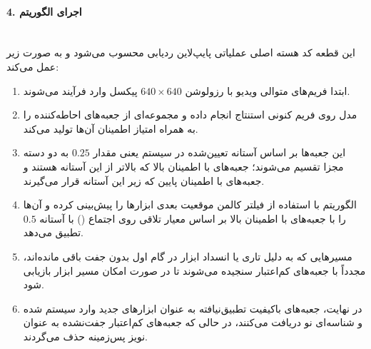 \documentclass{article}
\begin{document}
\paragraph{4. اجرای الگوریتم }\mbox{}\\
این قطعه کد هسته اصلی عملیاتی پایپ‌لاین ردیابی محسوب می‌شود و به صورت زیر عمل می‌کند:
\begin{enumerate}
	\item
	ابتدا فریم‌های متوالی ویدیو با رزولوشن $640 \times 640$ پیکسل وارد فرآیند می‌شوند.
	\item
	مدل  روی فریم کنونی استنتاج انجام داده و مجموعه‌ای از جعبه‌های احاطه‌کننده را به همراه امتیاز اطمینان آن‌ها تولید می‌کند.
	\item
	این جعبه‌ها بر اساس آستانه تعیین‌شده در سیستم یعنی مقدار $0.25$ به دو دسته مجزا تقسیم می‌شوند؛ جعبه‌های با اطمینان بالا که بالاتر از این آستانه هستند و جعبه‌های با اطمینان پایین که زیر این آستانه قرار می‌گیرند.
	\item
	الگوریتم  با استفاده از فیلتر کالمن موقعیت بعدی ابزارها را پیش‌بینی کرده و آن‌ها را با جعبه‌های با اطمینان بالا بر اساس معیار تلاقی روی اجتماع () با آستانه $0.5$ تطبیق می‌دهد.
	\item
	مسیرهایی که به دلیل تاری یا انسداد ابزار در گام اول بدون جفت باقی مانده‌اند، مجدداً با جعبه‌های کم‌اعتبار سنجیده می‌شوند تا در صورت امکان مسیر ابزار بازیابی شود.
	\item
	در نهایت، جعبه‌های باکیفیت تطبیق‌نیافته به عنوان ابزارهای جدید وارد سیستم شده و شناسه‌ای نو دریافت می‌کنند، در حالی که جعبه‌های کم‌اعتبار جفت‌نشده به عنوان نویز پس‌زمینه حذف می‌گردند.
\end{enumerate}
\end{document}
